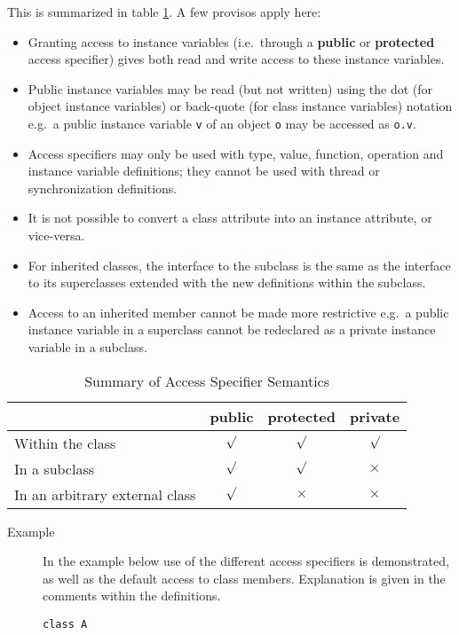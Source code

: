 \documentclass{overturerepchap}
\newcommand{\keyw}[1]{{\bf\ttfamily #1}}
\begin{document}
{This is summarized in table \ref{table:access}. A few provisos apply
here:
\begin{itemize}
\item Granting access to instance variables (i.e.\ through
a \keyw{public} or \keyw{protected} access specifier) gives
both read and write access to these instance variables.
\item Public instance variables may be read (but not written) using
  the dot (for object instance variables) or back-quote (for class
  instance variables) notation e.g.\ a public instance variable
  \texttt{v} of an object \texttt{o} may be accessed as \texttt{o.v}.
\item Access specifiers may only be used with type, value, function,
  operation and instance variable definitions; they cannot be used
  with thread or synchronization definitions.
\item It is not possible to convert a class attribute into an instance
  attribute, or vice-versa.
\item For inherited classes, the interface to the subclass is the same
  as the interface to its superclasses extended with the new
  definitions within the subclass.
\item Access to an inherited member cannot be made more restrictive
  e.g.\ a public instance variable in a superclass cannot be
  redeclared as a private instance variable in a subclass.
\end{itemize}

\begin{table}
\begin{center}
\begin{tabular}{|l|c|c|c|}\hline
                 & \keyw{public} & \keyw{protected} & \keyw{private}\\ \hline
Within the class & $\surd$       & $\surd$          & $\surd$ \\
In a subclass    & $\surd$       & $\surd$          & $\times$\\
In an arbitrary
external class   & $\surd$       & $\times$         & $\times$ \\
\hline
\end{tabular}
\end{center}
\caption{Summary of Access Specifier Semantics}\label{table:access}
\end{table}
\begin{description}
\item[Example] In the example below use of the different access
  specifiers is demonstrated, as well as the default access to class
  members. Explanation is given in the comments within the definitions.
\begin{lstlisting}
class A


\end{lstlisting}
\end{description}}
\end{document}
